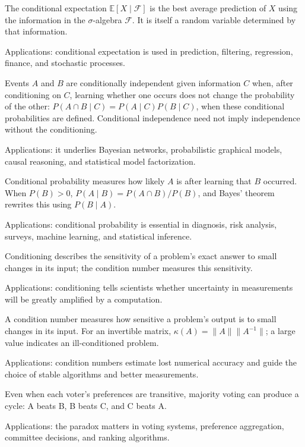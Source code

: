 The conditional expectation $\mathbb E[X\mid\mathcal F]$ is the best average prediction of $X$ using the information in the $\sigma$-algebra $\mathcal F$. It is itself a random variable determined by that information. \par\noindent Applications: conditional expectation is used in prediction, filtering, regression, finance, and stochastic processes.

Events \(A\) and \(B\) are conditionally independent given information \(C\) when, after conditioning on \(C\), learning whether one occurs does not change the probability of the other: \(P(A\cap B\mid C)=P(A\mid C)P(B\mid C)\), when these conditional probabilities are defined. Conditional independence need not imply independence without the conditioning. \par\noindent Applications: it underlies Bayesian networks, probabilistic graphical models, causal reasoning, and statistical model factorization.

Conditional probability measures how likely $A$ is after learning that $B$ occurred. When $P(B)>0$, $P(A\mid B)=P(A\cap B)/P(B)$, and Bayes' theorem rewrites this using $P(B\mid A)$. \par\noindent Applications: conditional probability is essential in diagnosis, risk analysis, surveys, machine learning, and statistical inference.

Conditioning describes the sensitivity of a problem's exact answer to small changes in its input; the condition number measures this sensitivity. \par\noindent Applications: conditioning tells scientists whether uncertainty in measurements will be greatly amplified by a computation.

A condition number measures how sensitive a problem's output is to small changes in its input. For an invertible matrix, $\kappa(A)=\|A\|\|A^{-1}\|$; a large value indicates an ill-conditioned problem. \par\noindent Applications: condition numbers estimate lost numerical accuracy and guide the choice of stable algorithms and better measurements.

Even when each voter's preferences are transitive, majority voting can produce a cycle: A beats B, B beats C, and C beats A. \par\noindent Applications: the paradox matters in voting systems, preference aggregation, committee decisions, and ranking algorithms.

